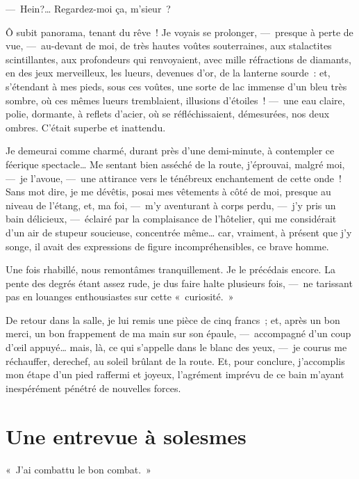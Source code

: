 \documentclass[french,twoside]{book} %
\newcommand{\salute}[1]{\bigbreak{#1}\par\medbreak}
\begin{document}
— Hein?… Regardez-moi ça, m’sieur ?\par
Ô subit panorama, tenant du rêve ! Je voyais   se prolonger, — presque à perte de vue, — au-devant de moi, de très hautes voûtes souterraines, aux stalactites scintillantes, aux profondeurs qui renvoyaient, avec mille réfractions de diamants, en des jeux merveilleux, les lueurs, devenues d’or, de la lanterne sourde : et, s’étendant à mes pieds, sous ces voûtes, une sorte de lac immense d’un bleu très sombre, où ces mêmes lueurs tremblaient, illusions d’étoiles ! — une eau claire, polie, dormante, à reflets d’acier, où se réfléchissaient, démesurées, nos deux ombres. C’était superbe et inattendu.\par
Je demeurai comme charmé, durant près d’une demi-minute, à contempler ce féerique spectacle… Me sentant bien asséché de la route, j’éprouvai, malgré moi, — je l’avoue, — une attirance vers le ténébreux enchantement de cette onde ! Sans mot dire, je me dévêtis, posai mes vêtements à côté de moi, presque au niveau de l’étang, et, ma foi, — m’y aventurant à corps perdu, — j’y pris un bain délicieux, — éclairé par la complaisance de l’hôtelier, qui me considérait d’un air de stupeur soucieuse,   concentrée même… car, vraiment, à présent que j’y songe, il avait des expressions de figure incompréhensibles, ce brave homme.\par
Une fois rhabillé, nous remontâmes tranquillement. Je le précédais encore. La pente des degrés étant assez rude, je dus faire halte plusieurs fois, — ne tarissant pas en louanges enthousiastes sur cette « curiosité. »\par
De retour dans la salle, je lui remis une pièce de cinq francs ; et, après un bon merci, un bon frappement de ma main sur son épaule, — accompagné d’un coup d’œil appuyé… mais, là, ce qui s’appelle dans le blanc des yeux, — je courus me réchauffer, derechef, au soleil brûlant de la route. Et, pour conclure, j’accomplis mon étape d’un pied raffermi et joyeux, l’agrément imprévu de ce bain m’ayant inespérément pénétré de nouvelles forces.
 \section[{Une entrevue à solesmes}]{Une entrevue à solesmes}\renewcommand{\leftmark}{Une entrevue à solesmes}


\salute{À M. le Docteur Albert Robin.}
\noindent « J’ai combattu le bon combat. »\par
\end{document}
